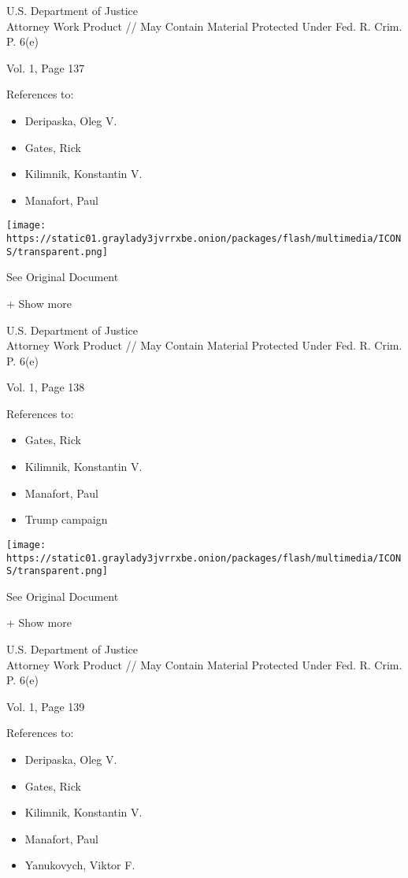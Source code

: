 U.S. Department of Justice\\
Attorney Work Product // May Contain Material Protected Under Fed. R.
Crim. P. 6(e)

Vol. 1, Page 137

References to:

\begin{itemize}
\tightlist
\item
  Deripaska, Oleg V.
\item
  Gates, Rick
\item
  Kilimnik, Konstantin V.
\item
  Manafort, Paul 
\end{itemize}

\protect\hyperlink{}{}

\texttt{[image: https://static01.graylady3jvrrxbe.onion/packages/flash/multimedia/ICONS/transparent.png]}

See Original Document

+ Show more

U.S. Department of Justice\\
Attorney Work Product // May Contain Material Protected Under Fed. R.
Crim. P. 6(e)

Vol. 1, Page 138

References to:

\begin{itemize}
\tightlist
\item
  Gates, Rick
\item
  Kilimnik, Konstantin V.
\item
  Manafort, Paul 
\item
  Trump campaign
\end{itemize}

\protect\hyperlink{}{}

\texttt{[image: https://static01.graylady3jvrrxbe.onion/packages/flash/multimedia/ICONS/transparent.png]}

See Original Document

+ Show more

U.S. Department of Justice\\
Attorney Work Product // May Contain Material Protected Under Fed. R.
Crim. P. 6(e)

Vol. 1, Page 139

References to:

\begin{itemize}
\tightlist
\item
  Deripaska, Oleg V.
\item
  Gates, Rick
\item
  Kilimnik, Konstantin V.
\item
  Manafort, Paul 
\item
  Yanukovych, Viktor F.
\end{itemize}


